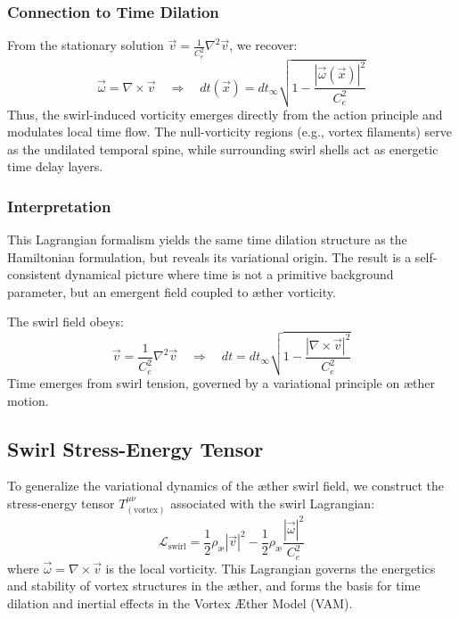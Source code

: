 \documentclass[12pt]{article}
\begin{document}
    \subsubsection*{Connection to Time Dilation}

    From the stationary solution \( \vec{v} = \frac{1}{C_e^2} \nabla^2 \vec{v} \), we recover:
    \begin{equation}
        \vec{\omega} = \nabla \times \vec{v} \quad \Rightarrow \quad
        dt(\vec{x}) = dt_\infty \sqrt{1 - \frac{|\vec{\omega}(\vec{x})|^2}{C_e^2}}
    \end{equation}
    Thus, the swirl-induced vorticity emerges directly from the action principle and modulates local time flow. The null-vorticity regions (e.g., vortex filaments) serve as the undilated temporal spine, while surrounding swirl shells act as energetic time delay layers.

    \subsubsection*{Interpretation}

    This Lagrangian formalism yields the same time dilation structure as the Hamiltonian formulation, but reveals its variational origin. The result is a self-consistent dynamical picture where time is not a primitive background parameter, but an emergent field coupled to æther vorticity.

    \begin{tcolorbox}[colback=blue!1, colframe=blue!60, title=Euler–Lagrange Summary]
        The swirl field obeys:
        \[
            \vec{v} = \frac{1}{C_e^2} \nabla^2 \vec{v}
            \quad \Longrightarrow \quad
            dt = dt_\infty \sqrt{1 - \frac{|\nabla \times \vec{v}|^2}{C_e^2}}
        \]
        Time emerges from swirl tension, governed by a variational principle on æther motion.
    \end{tcolorbox}



    \subsection{Swirl Stress-Energy Tensor}
    \label{sec:swirl_stress_tensor}

    To generalize the variational dynamics of the æther swirl field, we construct the stress-energy tensor \( T^{\mu\nu}_{(\text{vortex})} \) associated with the swirl Lagrangian:
    \begin{equation}
        \mathcal{L}_{\text{swirl}} = \frac{1}{2} \rho_\text{\ae} |\vec{v}|^2 - \frac{1}{2} \rho_\text{\ae} \frac{|\vec{\omega}|^2}{C_e^2}
    \end{equation}
    where \( \vec{\omega} = \nabla \times \vec{v} \) is the local vorticity. This Lagrangian governs the energetics and stability of vortex structures in the æther, and forms the basis for time dilation and inertial effects in the Vortex \AE ther Model (VAM).
\end{document}

